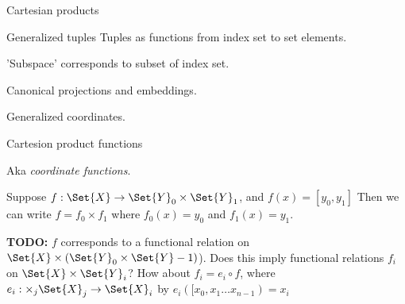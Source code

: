 \begin{plSection}{Cartesian products}
\begin{plSection}{Generalized tuples}
Tuples as functions from index set to set elements.

'Subspace' corresponds to subset of index set.

Canonical projections and embeddings.

Generalized coordinates.
\end{plSection}%
\begin{plSection}{Cartesion product functions}
\label{sec:Cartesion-product-functions}

Aka \textit{coordinate functions}.

Suppose $f : \Set{X} \rightarrow \Set{Y}_0 \times \Set{Y}_1$,
and $f \left( x \right) = \left[ y_0 ,y_1 \right]$
Then we can write $f = f_0 \times f_1$ where
$f_0 \left( x \right) = y_0 $
and
$f_1 \left( x \right) = y_1 $.

\textbf{TODO:} $f$ corresponds to a functional relation on 
$\Set{X} \times \left( \Set{Y}_0 \times \Set{Y}-1 \right)$).
Does this imply functional relations $f_i$ on
$\Set{X} \times \Set{Y}_i$?
How about $f_i = e_i \circ f$,
where $e_i : \times_j \Set{X}_j  \rightarrow \Set{X}_i$ by
$e_i \left( [x_0, x_1 \ldots  x_{n-1} \right) = x_i$ 

\end{plSection}%
\end{plSection}%

